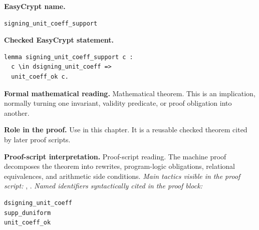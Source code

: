 \begin{formaltheorem}
\noindent\textbf{EasyCrypt name.}
\begin{lstlisting}[language=EasyCrypt,basicstyle=\ttfamily\scriptsize]
signing_unit_coeff_support
\end{lstlisting}
\noindent\textbf{Checked EasyCrypt statement.}
\begin{lstlisting}[language=EasyCrypt,basicstyle=\ttfamily\scriptsize]
lemma signing_unit_coeff_support c :
  c \in dsigning_unit_coeff =>
  unit_coeff_ok c.
\end{lstlisting}
\noindent\textbf{Formal mathematical reading.}
Mathematical theorem. This is an implication, normally turning one invariant, validity predicate, or proof obligation into another.

\noindent\textbf{Role in the proof.}
Use in this chapter. It is a reusable checked theorem cited by later proof scripts.

\noindent\textbf{Proof-script interpretation.}
Proof-script reading. The machine proof decomposes the theorem into rewrites, program-logic obligations, relational equivalences, and arithmetic side conditions.
\emph{Main tactics visible in the proof script:} , .
\emph{Named identifiers syntactically cited in the proof block:}
\begin{lstlisting}[language=EasyCrypt,basicstyle=\ttfamily\scriptsize]
dsigning_unit_coeff
supp_duniform
unit_coeff_ok
\end{lstlisting}

\end{formaltheorem}

